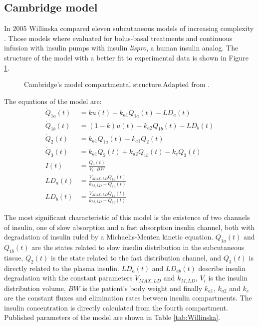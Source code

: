 \subsection{Cambridge model}
\label{sec:WillinskaEtAl}

In 2005 Willinska compared eleven subcutaneous models of increasing complexity \cite{wilinska2005insulin}. Those models where evaluated for bolus-basal treatments and continuous infusion with insulin pumps with insulin \textit{lispro}, a human insulin analog. The structure of the model with a better fit to experimental data is shown in Figure \ref{fig:willinska}.

\begin{figure}[hbtp]
\centering
{}\caption{Cambridge's model compartmental structure.Adapted from \cite{wilinska2005insulin}.}
\label{fig:willinska}
\end{figure}

The equations of the model are:
\begin{align}
	\dot{Q}_{1a}(t) &= ku(t)-k_{a1}Q_{1a}(t)-LD_{a}(t) \label{eq:Willinska1}\\
	\dot{Q}_{1b}(t) &= (1-k)u(t)-k_{a2}Q_{1b}(t)-LD_{b}(t) \label{eq:Willinska2}\\
	\dot{Q}_{2}(t) &= k_{a1}Q_{1a}(t)-k_{a1}Q_{2}(t)\label{eq:Willinska3}\\
	\dot{Q}_{3}(t) &= k_{a1}Q_{2}(t)+k_{a2}Q_{1b}(t)-k_{e}Q_{3}(t)\label{eq:Willinska4}\\
	I(t) &= \frac{Q_{3}(t)}{V_i\cdot BW} \label{eq:Willinska5}\\
	LD_{a}(t) &= \frac{V_{MAX,LD}Q_{1a}(t)}{k_{M,LD}+Q_{1a}(t)}\label{eq:Willinska6}\\
	LD_{b}(t) &= \frac{V_{MAX,LD}Q_{1b}(t)}{k_{M,LD}+Q_{1b}(t)}\label{eq:Willinska7}
\end{align}

The most significant characteristic of this model is the existence of two channels of insulin, one of slow absorption and a fast absorption insulin channel, both with degradation of insulin ruled by a Michaelis-Menten kinetic equation. ${Q}_{1a}(t)$ and ${Q}_{1b}(t)$ are the states related to slow insulin distribution in the subcutaneous tissue, ${Q}_{2}(t)$ is the state related to the fast distribution channel, and ${Q}_{3}(t)$ is directly related to the plasma insulin. $LD_{a}(t)$ and $LD_{ab}(t)$ describe insulin degradation with the constant parameters $V_{MAX,LD}$ and $k_{M,LD}$, $V_i$ is the insulin distribution volume, $BW$ is the patient's body weight and finally $k_{a1}$, $k_{a2}$ and $k_{e}$ are the constant fluxes and elimination rates between insulin compartments. The insulin concentration is directly calculated from the fourth compartment. Published parameters of the model are shown in Table \ref{tab:Willinska}.

